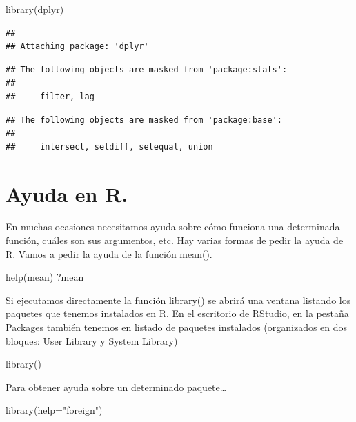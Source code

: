 \documentclass[
]{book}
\newenvironment{Shaded}{\begin{snugshade}}{\end{snugshade}}
\newcommand{\AttributeTok}[1]{\textcolor[rgb]{0.77,0.63,0.00}{#1}}
\newcommand{\FunctionTok}[1]{\textcolor[rgb]{0.00,0.00,0.00}{#1}}
\newcommand{\NormalTok}[1]{#1}
\newcommand{\StringTok}[1]{\textcolor[rgb]{0.31,0.60,0.02}{#1}}
\begin{document}
\begin{Shaded}
\begin{Highlighting}[]
\FunctionTok{library}\NormalTok{(dplyr)}
\end{Highlighting}
\end{Shaded}

\begin{verbatim}
## 
## Attaching package: 'dplyr'
\end{verbatim}

\begin{verbatim}
## The following objects are masked from 'package:stats':
## 
##     filter, lag
\end{verbatim}

\begin{verbatim}
## The following objects are masked from 'package:base':
## 
##     intersect, setdiff, setequal, union
\end{verbatim}

\hypertarget{ayuda-en-r.}{%
\section{Ayuda en R.}\label{ayuda-en-r.}}

En muchas ocasiones necesitamos ayuda sobre cómo funciona una determinada función, cuáles son sus argumentos, etc. Hay varias formas de pedir la ayuda de R. Vamos a pedir la ayuda de la función mean().

\begin{Shaded}
\begin{Highlighting}[]
\FunctionTok{help}\NormalTok{(mean)}
\NormalTok{?mean}
\end{Highlighting}
\end{Shaded}

Si ejecutamos directamente la función library() se abrirá una ventana listando los paquetes que tenemos instalados en R. En el escritorio de RStudio, en la pestaña Packages también tenemos en listado de paquetes instalados (organizados en dos bloques: User Library y System Library)

\begin{Shaded}
\begin{Highlighting}[]
\FunctionTok{library}\NormalTok{()}
\end{Highlighting}
\end{Shaded}

Para obtener ayuda sobre un determinado paquete\ldots{}

\begin{Shaded}
\begin{Highlighting}[]
\FunctionTok{library}\NormalTok{(}\AttributeTok{help=}\StringTok{"foreign"}\NormalTok{)}
\end{Highlighting}
\end{Shaded}
\end{document}
